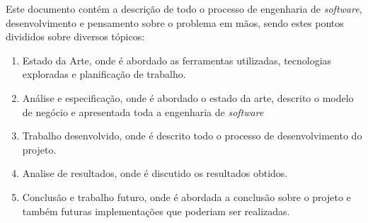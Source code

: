 Este documento contém a descrição de todo o processo de engenharia de \textit{software}, desenvolvimento e pensamento sobre o problema em mãos, sendo estes pontos divididos sobre diversos tópicos:
\begin{enumerate}
    \item Estado da Arte, onde é abordado as ferramentas utilizadas, tecnologias exploradas e planificação de trabalho.
    \item Análise e especificação, onde é abordado o estado da arte, descrito o modelo de negócio e apresentada toda a engenharia de \textit{software}
    \item Trabalho desenvolvido, onde é descrito todo o processo de desenvolvimento do projeto.
    \item Analise de resultados, onde é discutido os resultados obtidos.
    \item Conclusão e trabalho futuro, onde é abordada a conclusão sobre o projeto e também futuras implementações que poderiam ser realizadas.
\end{enumerate}


